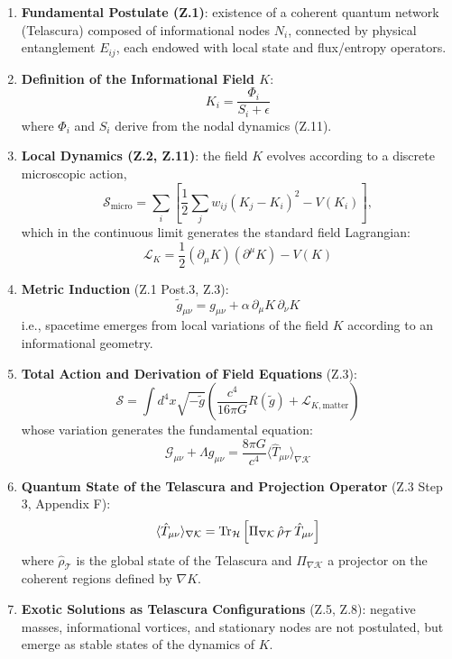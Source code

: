 \documentclass[12pt]{article}
\begin{document}
\begin{enumerate}
    \item \textbf{Fundamental Postulate (Z.1)}: existence of a coherent quantum network (Telascura) composed of informational nodes \( N_i \), connected by physical entanglement \( E_{ij} \), each endowed with local state and flux/entropy operators.

    \item \textbf{Definition of the Informational Field \( K \)}: 
    \[
    K_i = \frac{\Phi_i}{S_i + \epsilon}
    \]
    where \( \Phi_i \) and \( S_i \) derive from the nodal dynamics (Z.11).

    \item \textbf{Local Dynamics (Z.2, Z.11)}: the field \( K \) evolves according to a discrete microscopic action,
    \[
    \mathcal{S}_{\text{micro}} = \sum_{i} \left[ \frac{1}{2} \sum_{j} w_{ij} (K_j - K_i)^2 - V(K_i) \right],
    \]
    which in the continuous limit generates the standard field Lagrangian:
    \[
    \mathcal{L}_K = \frac{1}{2} (\partial_\mu K)(\partial^\mu K) - V(K)
    \]

    \item \textbf{Metric Induction} (Z.1 Post.3, Z.3):
    \[
    \tilde{g}_{\mu\nu} = g_{\mu\nu} + \alpha\, \partial_\mu K\, \partial_\nu K
    \]
    i.e., spacetime emerges from local variations of the field \( K \) according to an informational geometry.

    \item \textbf{Total Action and Derivation of Field Equations} (Z.3):
    \[
    \mathcal{S} = \int d^4x \sqrt{-\tilde{g}} \left( \frac{c^4}{16\pi G} R(\tilde{g}) + \mathcal{L}_{K,\text{matter}} \right)
    \]
    whose variation generates the fundamental equation:
    \[
    \mathcal{G}_{\mu\nu} + \Lambda g_{\mu\nu} = \frac{8\pi G}{c^4} \langle \hat{T}_{\mu\nu} \rangle_{\nabla \mathcal{K}}
    \]

    \item \textbf{Quantum State of the Telascura and Projection Operator} (Z.3 Step 3, Appendix F):
    \[
    \langle \hat{T}_{\mu\nu} \rangle_{\nabla \mathcal{K}} = \Tr_{\mathcal{H}} \left[ \Pi_{\nabla \mathcal{K}}\, \hat{\rho}_{\mathcal{T}}\, \hat{T}_{\mu\nu} \right]
    \]
    where \(\hat{\rho}_{\mathcal{T}}\) is the global state of the Telascura and \(\Pi_{\nabla \mathcal{K}}\) a projector on the coherent regions defined by \( \nabla K \).

    \item \textbf{Exotic Solutions as Telascura Configurations} (Z.5, Z.8): negative masses, informational vortices, and stationary nodes are not postulated, but emerge as stable states of the dynamics of \( K \).


\end{enumerate}
\end{document}
